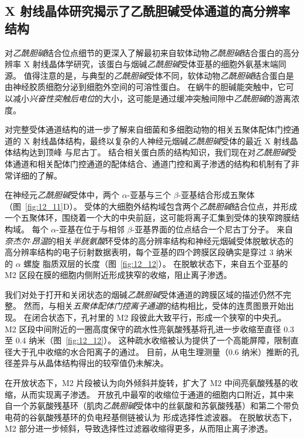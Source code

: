 \subsection{X 射线晶体研究揭示了乙酰胆碱受体通道的高分辨率结构}

对\textit{乙酰胆碱}结合位点细节的更深入了解最初来自软体动物\textit{乙酰胆碱}结合蛋白的高分辨率 X 射线晶体学研究，该蛋白与烟碱\textit{乙酰胆碱}受体亚基的细胞外氨基末端同源。
值得注意的是，与典型的\textit{乙酰胆碱}受体不同，软体动物\textit{乙酰胆碱}结合蛋白是由神经胶质细胞分泌到细胞外空间的可溶性蛋白。
在蜗牛的胆碱能突触中，它可以减小\textit{兴奋性突触后电位}的大小，这可能是通过缓冲突触间隙中\textit{乙酰胆碱}的游离浓度。


对完整受体通道结构的进一步了解来自细菌和多细胞动物的相关五聚体配体门控通道的 X 射线晶体结构，最终以复杂的人神经元烟碱\textit{乙酰胆碱}受体的最近 X 射线晶体结构达到顶峰 与尼古丁。
结合相关蛋白质的结构知识，我们现在对\textit{乙酰胆碱}受体通道和相关配体门控通道的配体结合、通道门控和离子渗透的结构和机制有了非常详细的了解。


在神经元\textit{乙酰胆碱}受体中，两个 $\alpha$-亚基与三个 $\beta$-亚基结合形成五聚体（图~\ref{fig:12_11}D）。
受体的大细胞外结构域包含两个\textit{乙酰胆碱}结合位点，并形成一个五聚体环，围绕着一个大的中央前庭，这可能将离子汇集到受体的狭窄跨膜结构域。
每个 $\alpha$-亚基在位于与相邻 $\beta$-亚基界面的位点结合一个尼古丁分子。
来自\textit{奈杰尔$\cdot$昂温}的相关\textit{半胱氨酸}环受体的高分辨率结构和神经元烟碱受体脱敏状态的高分辨率结构的电子衍射数据表明，每个亚基的四个跨膜区段确实是穿过 3 纳米的 $\alpha$ 螺旋 脂质双层的长度（图~\ref{fig:12_12}）。
在脱敏状态下，来自五个亚基的 M2 区段在膜的细胞内侧附近形成狭窄的收缩，阻止离子渗透。


我们对处于打开和关闭状态的烟碱\textit{乙酰胆碱}受体通道的跨膜区域的描述仍然不完整。
然而，与相关\textit{五聚体配体门控离子通道}的结构相比，受体的连贯图景开始出现。
在闭合状态下，孔衬里的 M2 段彼此大致平行，形成一个狭窄的中央孔。
M2 区段中间附近的一圈高度保守的疏水性亮氨酸残基将孔进一步收缩至直径 0.3 至 0.4 纳米（图~\ref{fig:12_12}）。
这种疏水收缩被认为提供了一个高能屏障，限制直径大于孔中收缩的水合阳离子的通过。
目前，从电生理测量（0.6 纳米）推断的孔径差异与从晶体结构得出的较窄值仍未解决。


在开放状态下，M2 片段被认为向外倾斜并旋转，扩大了 M2 中间亮氨酸残基的收缩，从而实现离子渗透。
开放孔中最窄的收缩位于通道的细胞内口附近，其中来自一个苏氨酸残基环（肌肉\textit{乙酰胆碱}受体中的丝氨酸和苏氨酸残基）和第二个带负电荷的谷氨酸残基环的负电羟基侧链被认为 形成选择性滤波器。
在脱敏状态下，M2 部分进一步倾斜，导致选择性过滤器收缩得更多，从而阻止离子渗透。


